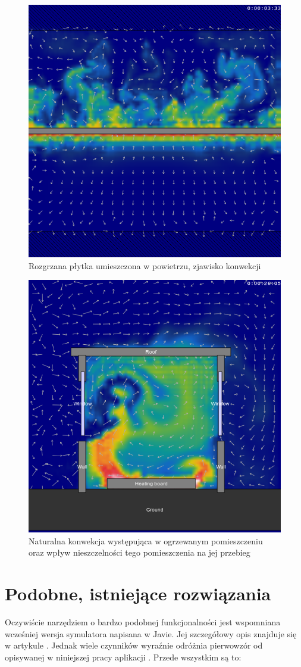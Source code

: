 \begin{figure}[!h]
\centering
\includegraphics[width=.6\textwidth]{img/fluidExample1}
\caption{Rozgrzana płytka umieszczona w powietrzu, zjawisko konwekcji}
\label{fig:fluidExample1}
\end{figure}

\begin{figure}[!h]
\centering
\includegraphics[width=.6\textwidth]{img/fluidExample2}
\caption{Naturalna konwekcja występująca w ogrzewanym pomieszczeniu oraz wpływ 
nieszczelności tego pomieszczenia na jej przebieg}
\label{fig:fluidExample2}
\end{figure}

\section{Podobne, istniejące rozwiązania}

Oczywiście narzędziem o bardzo podobnej funkcjonalności jest wspomniana
wcześniej wersja symulatora \en napisana w Javie. Jej szczegółowy opis znajduje
się w artykule \cite{orgEnergy2D}. Jednak wiele czynników wyraźnie odróżnia
pierwowzór od opisywanej w niniejszej pracy aplikacji \en. Przede wszystkim są
to:

